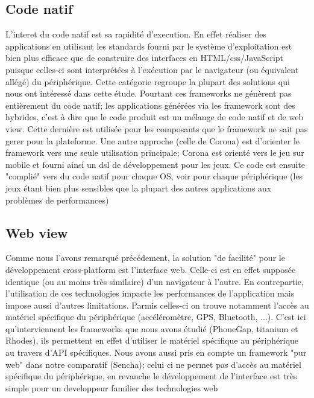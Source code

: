 \documentclass{article}
\begin{document}
\subsection{Code natif}
L'interet du code natif est sa rapidité d'execution. En effet réaliser des applications en utilisant les standards fourni par le système d'exploitation est bien plus efficace que de construire des interfaces en HTML/css/JavaScript puisque celles-ci sont interprétées à l'exécution par le navigateur (ou équivalent allégé) du périphérique.
Cette catégorie regroupe la plupart des solutions qui nous ont intéressé dans cette étude. Pourtant ces frameworks ne génèrent pas entièrement du code natif; les applications générées via les framework sont des hybrides, c'est à dire que le code produit est un mélange de code natif et de web view. Cette dernière est utilisée pour les composants que le framework ne sait pas gerer pour la plateforme. Une autre approche (celle de Corona) est d'orienter le framework vers une seule utilisation principale; Corona est orienté vers le jeu sur mobile et fourni ainsi un dsl de développement pour les jeux. Ce code est ensuite "complié" vers du code natif pour chaque OS, voir pour chaque périphérique (les jeux étant bien plus sensibles que la plupart des autres applications aux problèmes de performances)

\subsection{Web view}
Comme nous l'avons remarqué précédement, la solution "de facilité" pour le développement cross-platform est l'interface web. Celle-ci est en effet supposée identique (ou au moins très similaire) d'un navigateur à l'autre. En contrepartie, l'utilisation de ces technologies impacte les performances de l'application mais impose aussi d'autres limitations. Parmis celles-ci on trouve notamment l'accès au matériel spécifique du périphérique (accéléromètre, GPS, Bluetooth, ...). C'est ici qu'interviennent les frameworks que nous avons étudié (PhoneGap, titanium et Rhodes), ils permettent en effet d'utiliser le matériel spécifique au périphérique au travers d'API spécifiques. Nous avons aussi pris en compte un framework "pur web" dans notre comparatif (Sencha); celui ci ne permet pas d'accès au matériel spécifique du périphérique, en revanche le développement de l'interface est très simple pour un developpeur familier des technologies web
\end{document}
